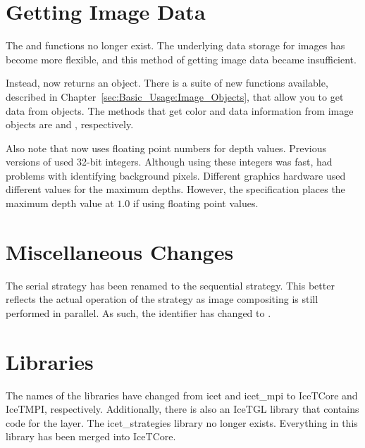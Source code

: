 \section{Getting Image Data}
\label{sec:Transitioning:Getting_Image_Data}

The  and
 functions no longer
exist.  The underlying data storage for images has become more flexible,
and this method of getting image data became insufficient.

Instead,  now returns an  object.
There is a suite of new functions available, described in
Chapter~\ref{sec:Basic_Usage:Image_Objects}, that allow you to get data
from  objects.  The methods that get color and data
information from image objects are  and
, respectively.

Also note that \IceT now uses floating point numbers for depth values.
Previous versions of \IceT used 32-bit integers.  Although using these
integers was fast, \IceT had problems with identifying background pixels.
Different graphics hardware used different values for the maximum depths.
However, the \OpenGL specification places the maximum depth value at $1.0$
if using floating point values.

\section{Miscellaneous Changes}
\label{sec:Transitioning:Miscellaneous}

The serial strategy has been renamed to the sequential strategy.  This
better reflects the actual operation of the strategy as image compositing
is still performed in parallel.  As such, the
 identifier has changed to
.

\section{Libraries}
\label{sec:Transitioning:Libraries}

The names of the libraries have changed from icet and
icet\_mpi to IceTCore
and IceTMPI, respectively.  Additionally, there is
also an IceTGL library that contains code for the
\OpenGL layer.  The icet\_strategies
library no longer exists.  Everything in this library has been merged into
IceTCore.

